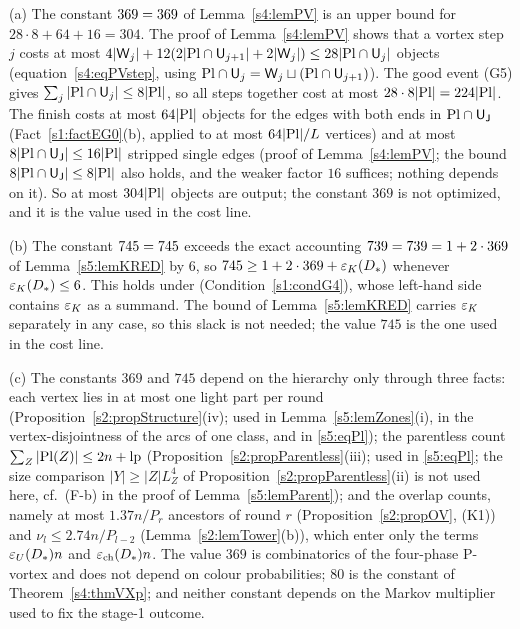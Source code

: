 \begin{remark}\label{s5:remConstants}
(a) The constant $369=369$ of Lemma~\ref{s4:lemPV} is an upper bound for $28\cdot8+64+16=304$. The proof of Lemma~\ref{s4:lemPV} shows that a vortex step $j$ costs at most $4|\mathsf{W}_j|+12(2|\mathrm{Pl}\cap\mathsf{U}_{j+1}|+2|\mathsf{W}_j|)\le28|\mathrm{Pl}\cap\mathsf{U}_j|$ objects (equation~\eqref{s4:eqPVstep}, using $\mathrm{Pl}\cap\mathsf{U}_j=\mathsf{W}_j\sqcup(\mathrm{Pl}\cap\mathsf{U}_{j+1})$). The good event (G5) gives $\sum_j|\mathrm{Pl}\cap\mathsf{U}_j|\le8|\mathrm{Pl}|$, so all steps together cost at most $28\cdot8|\mathrm{Pl}|=224|\mathrm{Pl}|$. The finish costs at most $64|\mathrm{Pl}|$ objects for the edges with both ends in $\mathrm{Pl}\cap\mathsf{U}_{\mathsf{J}}$ (Fact~\ref{s1:factEG0}(b), applied to at most $64|\mathrm{Pl}|/L$ vertices) and at most $8|\mathrm{Pl}\cap\mathsf{U}_{\mathsf{J}}|\le16|\mathrm{Pl}|$ stripped single edges (proof of Lemma~\ref{s4:lemPV}; the bound $8|\mathrm{Pl}\cap\mathsf{U}_{\mathsf{J}}|\le8|\mathrm{Pl}|$ also holds, and the weaker factor $16$ suffices; nothing depends on it). So at most $304|\mathrm{Pl}|$ objects are output; the constant $369$ is not optimized, and it is the value used in the cost line.

(b) The constant $745=745$ exceeds the exact accounting $739=739=1+2\cdot369$ of Lemma~\ref{s5:lemKRED} by $6$, so $745\ge1+2\cdot369+\varepsilon_{K}(D_{*})$ whenever $\varepsilon_{K}(D_{*})\le6$. This holds under  (Condition~\ref{s1:condG4}), whose left-hand side contains $\varepsilon_{K}$ as a summand. The bound of Lemma~\ref{s5:lemKRED} carries $\varepsilon_{K}$ separately in any case, so this slack is not needed; the value $745$ is the one used in the cost line.

(c) The constants $369$ and $745$ depend on the hierarchy only through three facts: each vertex lies in at most one light part per round (Proposition~\ref{s2:propStructure}(iv); used in Lemma~\ref{s5:lemZones}(i), in the vertex-disjointness of the arcs of one class, and in \eqref{s5:eqPl}); the parentless count $\sum_Z|\mathrm{Pl}(Z)|\le2n+\mathrm{lp}$ (Proposition~\ref{s2:propParentless}(iii); used in \eqref{s5:eqPl}; the size comparison $|Y|\ge|Z|L_Z^4$ of Proposition~\ref{s2:propParentless}(ii) is not used here, cf.\ (F-b) in the proof of Lemma~\ref{s5:lemParent}); and the overlap counts, namely at most $1.37n/P_r$ ancestors of round $r$ (Proposition~\ref{s2:propOV}, (K1)) and $\nu_l\le2.74n/P_{l-2}$ (Lemma~\ref{s2:lemTower}(b)), which enter only the terms $\varepsilon_{U}(D_{*})n$ and $\varepsilon_{\mathrm{ch}}(D_{*})n$. The value $369$ is combinatorics of the four-phase P-vortex and does not depend on colour probabilities; $80$ is the constant of Theorem~\ref{s4:thmVXp}; and neither constant depends on the Markov multiplier used to fix the stage-1 outcome.
\deps{\ref{s4:lemPV}, \ref{s5:lemKRED}, \ref{s2:propStructure}, \ref{s2:propParentless}, \ref{s2:propOV}, \ref{s2:lemTower}, \ref{s4:thmVXp}, \ref{s1:condG4}, \ref{s1:factEG0}}
\end{remark}
